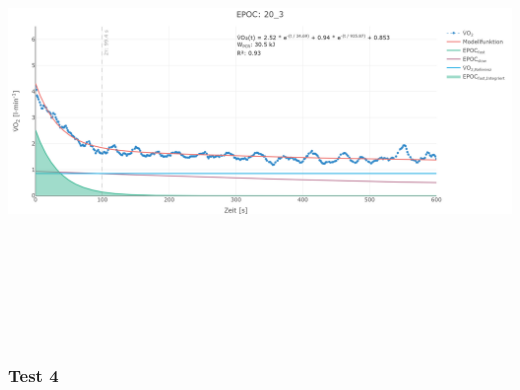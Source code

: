\documentclass[
  letterpaper,
  DIV=11]{scrartcl}
\begin{document}
\includegraphics[width=11.45833in,height=4.6875in]{images/20_3.png}

\subsubsection{Test 4}
\end{document}
